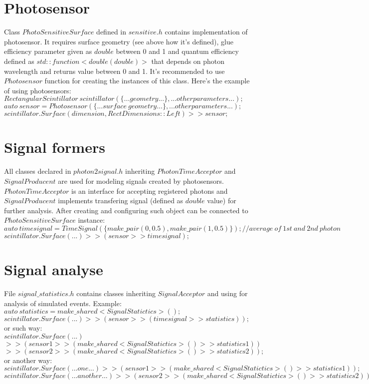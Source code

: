 \documentclass[a4paper]{article}
\begin{document}
\section{Photosensor}
Class $PhotoSensitiveSurface$ defined in $sensitive.h$ contains implementation of photosensor.
It requires surface geometry (see above how it's defined), glue efficiency parameter given as $double$ between 0 and 1 and quantum efficiency defined as $std::function<double(double)>$ that depends on photon wavelength and returns value between 0 and 1.
It's recommended to use $Photosensor$ function for creating the instances of this class.
Here's the example of using photosensors:\\
$RectangularScintillator~scintillator(\{...geometry...\},...other parameters...);$\\
$auto~sensor=Photosensor(\{...surface~geometry...\},...other parameters...);$\\
$scintillator.Surface(dimension,RectDimensions::Left)>>sensor;$
\section{Signal formers}
All classes declared in $photon2signal.h$ inheriting $PhotonTimeAcceptor$ and $SignalProducent$ are used for modeling signals created by photosensors.
$PhotonTimeAcceptor$ is an interface for accepting registered photons and $SignalProducent$ implements transfering signal (defined as $double$ value) for further analysis.
After creating and configuring such object can be connected to $PhotoSensitiveSurface$ instance:\\
$auto~timesignal=TimeSignal(\{make\_pair(0,0.5),make\_pair(1,0.5)\});//average~of~1st~and~2nd~photon$\\
$scintillator.Surface(...)>>(sensor>>timesignal);$
\section{Signal analyse}
File $signal\_statistics.h$ contains classes inheriting $SignalAcceptor$ and using for analysis of simulated events.
Example:\\
$auto~statistics=make\_shared<SignalStatictics>();$\\
$scintillator.Surface(...)>>(sensor>>(timesignal>>statistics));$\\
or such way:\\
$scintillator.Surface(...)$\\
$>>(sensor1>>(make\_shared<SignalStatictics>()>>statistics1))$\\
$>>(sensor2>>(make\_shared<SignalStatictics>()>>statistics2));$\\
or another way:\\
$scintillator.Surface(...one...)>>(sensor1>>(make\_shared<SignalStatictics>()>>statistics1));$\\
$scintillator.Surface(...another...)>>(sensor2>>(make\_shared<SignalStatictics>()>>statistics2));$
\end{document}
